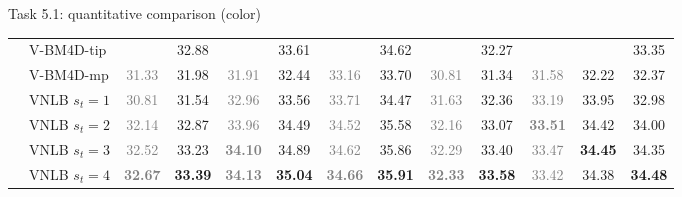 \documentclass[mathserif, 8pt]{beamer}
\newcommand{\best}[1]{#1}
\newcommand{\bsic}[1]{\textcolor{gray}{#1}}
\newcommand{\Bsic}[1]{\textcolor{gray}{\textbf{#1}}}
\newcommand{\Best}[1]{\textbf{\textcolor{MyOrangeBrighter}{#1}}}
\begin{document}
\begin{frame}{Task 5.1: quantitative comparison (color)}
\begin{center}
{\begin{tabular}{ c | l |c c | c c | c c | c c | c c | c}
			                      & V-BM4D-tip           & \bsic{     } & \best{32.88} & \bsic{     } & \best{33.61} & \bsic{     } & \best{34.62} & \bsic{     } & \best{32.27} & \bsic{     } & \best{     } &       33.35  \\
			                      & V-BM4D-mp            & \bsic{31.33} &       31.98  & \bsic{31.91} &       32.44  & \bsic{33.16} &       33.70  & \bsic{30.81} &       31.34  & \bsic{31.58} &       32.22  &       32.37  \\
			                      & VNLB   $s_t = 1$     & \bsic{30.81} &       31.54  & \bsic{32.96} &       33.56  & \bsic{33.71} &       34.47  & \bsic{31.63} &       32.36  & \bsic{33.19} &       33.95  &       32.98  \\
			                      & VNLB   $s_t = 2$     & \bsic{32.14} &       32.87  & \bsic{33.96} &       34.49  & \bsic{34.52} &       35.58  & \bsic{32.16} &       33.07  & \Bsic{33.51} & \best{34.42} &       34.00  \\
			                      & VNLB   $s_t = 3$     & \bsic{32.52} &       33.23  & \Bsic{34.10} &       34.89  & \bsic{34.62} & \best{35.86} & \bsic{32.29} &       33.40  & \bsic{33.47} & \Best{34.45} &       34.35  \\
			                      & VNLB   $s_t = 4$     & \Bsic{32.67} & \Best{33.39} & \Bsic{34.13} & \Best{35.04} & \Bsic{34.66} & \Best{35.91} & \Bsic{32.33} & \Best{33.58} & \bsic{33.42} & \best{34.38} & \Best{34.48} \\\hline
%                                                                                                                                                                                                                          

\end{tabular}}
\end{center}
\end{frame}
\end{document}
